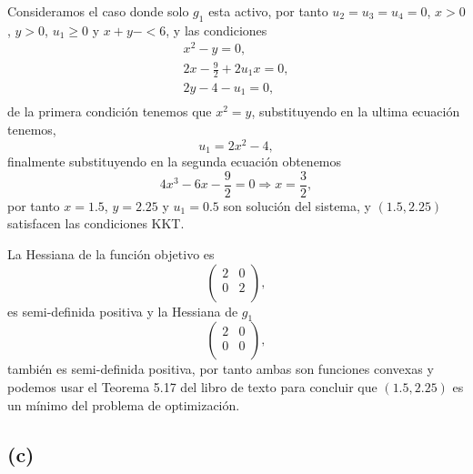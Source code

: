 Consideramos el caso donde solo $g_1$ esta activo,
por tanto $u_2 = u_3 = u_4 = 0$, $x > 0$, $y > 0$, $u_1 \geq 0$ y $x + y - < 6$,
y las condiciones
\begin{equation*}
\begin{aligned}
    x^2 - y = 0, \\
    2x - \frac{9}{2} + 2 u_1 x = 0, \\ 
    2y - 4 - u_1 = 0, \\ 
\end{aligned}
\end{equation*}
de la primera condición tenemos que $x^2 = y$,
substituyendo en la ultima ecuación tenemos,
\begin{equation*}
    u_1 = 2x^2 - 4,
\end{equation*}
finalmente substituyendo en la segunda ecuación obtenemos
\begin{equation*}
    4 x^3 - 6x - \frac{9}{2} = 0 \Rightarrow x = \frac{3}{2},
\end{equation*}
por tanto $x = 1.5$, $y = 2.25$ y $u_1 = 0.5$ son solución del sistema,
y $(1.5, 2.25)$ satisfacen las condiciones KKT.

La Hessiana de la función objetivo es
\begin{equation*}
\begin{pmatrix}
    2 & 0 \\
    0 & 2 \\
\end{pmatrix},
\end{equation*}
es semi-definida positiva y la Hessiana de $g_1$
\begin{equation*}
\begin{pmatrix}
    2 & 0 \\
    0 & 0 \\
\end{pmatrix},
\end{equation*}
también es semi-definida positiva,
por tanto ambas son funciones convexas y podemos usar el Teorema 5.17 del libro de texto para concluir que $(1.5, 2.25)$ es un mínimo del problema de optimización.

\subsection*{(c)}

